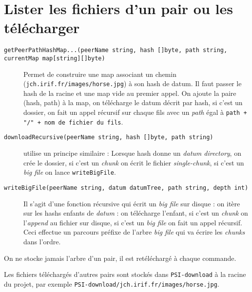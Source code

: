 \section{Lister les fichiers d'un pair ou les télécharger}
\begin{description}
    \item [\small\texttt{getPeerPathHashMap...(peerName string, hash []byte, path string, currentMap map[string][]byte)}\normalsize]
        Permet de construire une map associant un chemin (\texttt{jch.irif.fr/images/horse.jpg}) à son hash de datum. Il faut passer le hash de la racine et une map vide au premier appel. On ajoute la paire (hash, path) à la map, on télécharge le datum décrit par hash, si c'est un dossier, on fait un appel récursif sur chaque fils avec un \textit{path} égal à \texttt{path + "/" + nom de fichier du fils}.
    \item [\texttt{downloadRecursive(peerName string, hash []byte, path string)}] utilise un principe similaire :
        Lorsque hash donne un \textit{datum directory}, on crée le dossier, si c'est un \textit{chunk} on écrit le fichier \textit{single-chunk}, si c'est un \textit{big file} on lance \texttt{writeBigFile}.
    \item [\texttt{writeBigFile(peerName string, datum datumTree, path string, depth int)}]
    Il s'agit d'une fonction récursive qui écrit un \textit{big file} sur disque : on itère sur les hashs enfants de \textit{datum} : on télécharge l'enfant, si c'est un \textit{chunk} on l'\textit{append} au fichier sur disque, si c'est un \textit{big file} on fait un appel récursif. Ceci effectue un parcours préfixe de l'arbre \textit{big file} qui va écrire les \textit{chunks} dans l'ordre.

\end{description}


On ne stocke jamais l'arbre d'un pair, il est retéléchargé à chaque commande.

Les fichiers téléchargés d'autres pairs sont stockés dans \texttt{PSI-download} à la racine du projet, par exemple \texttt{PSI-download/jch.irif.fr/images/horse.jpg}.
